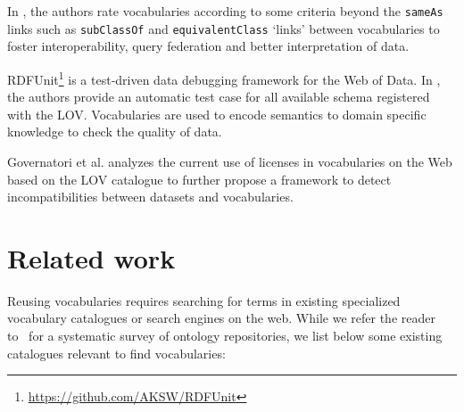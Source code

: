 \documentclass{iosart2c}
\newcommand{\ghis}[1]{\textcolor{brown}{\textbf{[GHIS TO:#1]}}}
\begin{document}
In \cite{janowicz2014five}, the authors rate vocabularies according to some criteria beyond the \texttt{sameAs} links such as \texttt{subClassOf} and \texttt{equivalentClass} `links' between vocabularies to foster interoperability, query federation and better interpretation of data. %

RDFUnit\footnote{\url{https://github.com/AKSW/RDFUnit}} is a test-driven data debugging framework for the Web of Data. In \cite{rdfunit}, the authors provide an automatic test case for all available schema registered with the LOV. Vocabularies are used to encode semantics to domain specific knowledge to check the quality of data.

Governatori et al. \cite{governatori2014} analyzes the current use of licenses in vocabularies on the Web based on the LOV catalogue to further propose a framework to detect incompatibilities between datasets and vocabularies.


\section{Related work}
\label{sec:related}
Reusing vocabularies requires searching for terms in existing specialized vocabulary catalogues or search engines on the web. While we refer the reader to~\cite{AquinJoWS12} for a systematic survey of ontology repositories, we list below some existing catalogues relevant to find vocabularies:  
\end{document}
